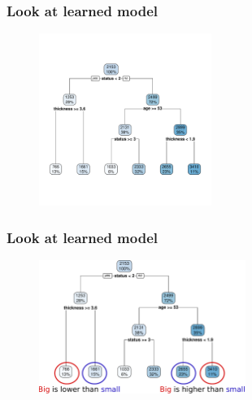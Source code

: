 \documentclass[handout, aspectratio = 169]{beamer}
\begin{document}
\begin{frame}
\frametitle{Look at learned model}
\vspace{-4mm}
\begin{figure}
    \includegraphics[width = 0.5\textwidth]{rpart_tree.pdf}
\end{figure} 

\end{frame} 



\begin{frame}
\frametitle{Look at learned model}
\vspace{2mm}
\begin{figure}
    \includegraphics[width = 0.6\textwidth]{rpart_annotate.pdf}
\end{figure} 

\end{frame} 
\end{document}
